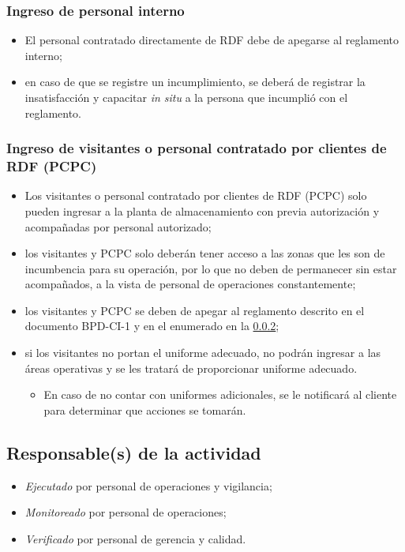 \subsubsection{Ingreso de personal interno}

\begin{itemize}
	\item El personal contratado directamente de RDF debe de apegarse al reglamento interno;
	\item en caso de que se registre un incumplimiento, se deberá de registrar la insatisfacción y capacitar \emph{in situ} a la persona que incumplió con el reglamento.
\end{itemize}

\subsubsection{Ingreso de visitantes o personal contratado por clientes de RDF (PCPC)}
\label{PCPC-reglamento}

\begin{itemize}
	\item Los visitantes o personal contratado por clientes de RDF (PCPC) solo pueden ingresar a la planta de almacenamiento con previa autorización y acompañadas por personal autorizado;
	\item los visitantes y PCPC solo deberán tener acceso a las zonas que les son de incumbencia para su operación, por lo que no deben de permanecer sin estar acompañados, a la vista de personal de operaciones constantemente;
	\item los visitantes y PCPC se deben de apegar al reglamento descrito en el documento BPD-CI-1 y en el enumerado en la \cref{PCPC-reglamento};
	\item si los visitantes no portan el uniforme adecuado, no podrán ingresar a las áreas operativas y se les tratará de proporcionar uniforme adecuado.
	\begin{itemize}
		\item En caso de no contar con uniformes adicionales, se le notificará al cliente para determinar que acciones se tomarán.
	\end{itemize}
\end{itemize}

\subsection{Responsable(s) de la actividad}

\begin{itemize}
	\item \emph{Ejecutado} por personal de operaciones y vigilancia;
	\item \emph{Monitoreado} por personal de operaciones;
	\item \emph{Verificado} por personal de gerencia y calidad.
\end{itemize}

